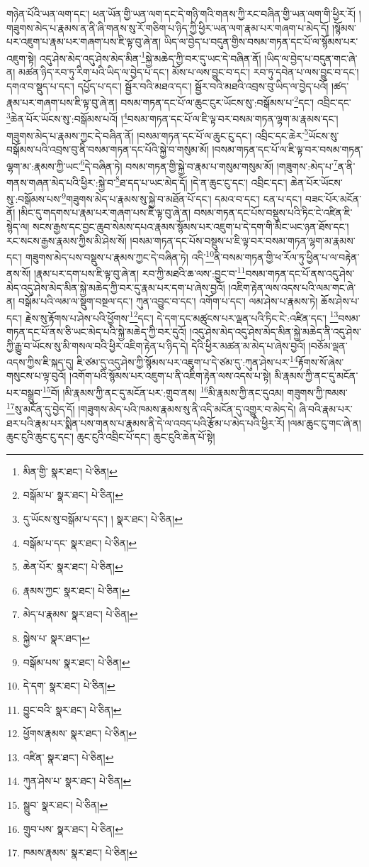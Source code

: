 གཉེན་པོའི་ཡན་ལག་དང་། ཕན་ཡོན་གྱི་ཡན་ལག་དང་དེ་གཉི་གའི་གནས་ཀྱི་རང་བཞིན་གྱི་ཡན་ལག་གི་ཕྱིར་རོ། །གཟུགས་མེད་པ་རྣམས་ན་ནི་ཞི་གནས་སུ་རོ་གཅིག་པ་ཉིད་ཀྱི་ཕྱིར་ཡན་ལག་རྣམ་པར་གཞག་པ་མེད་དོ། །སྙོམས་པར་འཇུག་པ་རྣམ་པར་གཞག་པས་ཇི་ལྟ་བུ་ཞེ་ན། ཡིད་ལ་བྱེད་པ་བདུན་གྱིས་བསམ་གཏན་དང་པོ་ལ་སྙོམས་པར་འཇུག་སྟེ། འདུ་ཤེས་མེད་འདུ་ཤེས་མེད་མིན་\footnote{མིན་གྱི་  སྣར་ཐང་།  པེ་ཅིན། }སྐྱེ་མཆེད་ཀྱི་བར་དུ་ཡང་དེ་བཞིན་ནོ། །ཡིད་ལ་བྱེད་པ་བདུན་གང་ཞེ་ན། མཚན་ཉིད་རབ་ཏུ་རིག་པའི་ཡིད་ལ་བྱེད་པ་དང་། མོས་པ་ལས་བྱུང་བ་དང་། རབ་ཏུ་དབེན་པ་ལས་བྱུང་བ་དང་། དགའ་བ་སྡུད་པ་དང་། དཔྱོད་པ་དང་། སྦྱོར་བའི་མཐའ་དང་། སྦྱོར་བའི་མཐའི་འབྲས་བུ་ཡིད་ལ་བྱེད་པའོ། །ཚད་རྣམ་པར་གཞག་པས་ཇི་ལྟ་བུ་ཞེ་ན། བསམ་གཏན་དང་པོ་ལ་ཆུང་ངུར་ཡོངས་སུ་:བསྒོམས་པ་\footnote{བསྒོམ་པ་  སྣར་ཐང་།  པེ་ཅིན། }དང་། འབྲིང་དང་\footnote{དུ་ཡོངས་སུ་བསྒོམ་པ་དང་། །  སྣར་ཐང་།  པེ་ཅིན། }ཆེན་པོར་ཡོངས་སུ་:བསྒོམས་པའོ། །\footnote{བསྒོམ་པ་དང་  སྣར་ཐང་།  པེ་ཅིན། }བསམ་གཏན་དང་པོ་ལ་ཇི་ལྟ་བར་བསམ་གཏན་ལྷག་མ་རྣམས་དང་། གཟུགས་མེད་པ་རྣམས་ཀྱང་དེ་བཞིན་ནོ། །བསམ་གཏན་དང་པོ་ལ་ཆུང་ངུ་དང་། འབྲིང་དང་ཆེར་\footnote{ཆེན་པོར་  སྣར་ཐང་།  པེ་ཅིན། }ཡོངས་སུ་བསྒོམས་པའི་འབྲས་བུ་ནི་བསམ་གཏན་དང་པོའི་སྐྱེ་བ་གསུམ་མོ། །བསམ་གཏན་དང་པོ་ལ་ཇི་ལྟ་བར་བསམ་གཏན་ལྷག་མ་:རྣམས་ཀྱི་ཡང་\footnote{རྣམས་ཀྱང་  སྣར་ཐང་།  པེ་ཅིན། }དེ་བཞིན་ཏེ། བསམ་གཏན་གྱི་སྐྱེ་བ་རྣམ་པ་གསུམ་གསུམ་མོ། །གཟུགས་:མེད་པ་\footnote{མེད་པ་རྣམས་  སྣར་ཐང་།  པེ་ཅིན། }ན་ནི་གནས་གཞན་མེད་པའི་ཕྱིར་:སྐྱེ་བ་\footnote{སྐྱེས་པ་  སྣར་ཐང་། }ཐ་དད་པ་ཡང་མེད་དོ། །དེ་ན་ཆུང་ངུ་དང་། འབྲིང་དང་། ཆེན་པོར་ཡོངས་སུ་:བསྒོམས་པས་\footnote{བསྒོམ་པས་  སྣར་ཐང་།  པེ་ཅིན། }གཟུགས་མེད་པ་རྣམས་སུ་སྐྱེ་བ་མཐོན་པོ་དང་། དམའ་བ་དང་། ངན་པ་དང་། བཟང་པོར་མངོན་ནོ། །མིང་དུ་གདགས་པ་རྣམ་པར་གཞག་པས་ཇི་ལྟ་བུ་ཞེ་ན། བསམ་གཏན་དང་པོས་བསྡུས་པའི་ཏིང་ངེ་འཛིན་ཇི་སྙེད་ལ། སངས་རྒྱས་དང་བྱང་ཆུབ་སེམས་དཔའ་རྣམས་སྙོམས་པར་འཇུག་པ་དེ་དག་གི་མིང་ཡང་ཉན་ཐོས་དང་། རང་སངས་རྒྱས་རྣམས་ཀྱིས་མི་ཤེས་སོ། །བསམ་གཏན་དང་པོས་བསྡུས་པ་ཇི་ལྟ་བར་བསམ་གཏན་ལྷག་མ་རྣམས་དང་། གཟུགས་མེད་པས་བསྡུས་པ་རྣམས་ཀྱང་དེ་བཞིན་ཏེ། འདི་\footnote{དེ་དག་  སྣར་ཐང་།  པེ་ཅིན། }ནི་བསམ་གཏན་གྱི་ཕ་རོལ་ཏུ་ཕྱིན་པ་ལ་བརྟེན་ནས་སོ། །རྣམ་པར་དག་པས་ཇི་ལྟ་བུ་ཞེ་ན། རབ་ཀྱི་མཐའི་ཆ་ལས་:བྱུང་བ་\footnote{བྱུང་བའི་  སྣར་ཐང་།  པེ་ཅིན། }བསམ་གཏན་དང་པོ་ནས་འདུ་ཤེས་མེད་འདུ་ཤེས་མེད་མིན་སྐྱེ་མཆེད་ཀྱི་བར་དུ་རྣམ་པར་དག་པ་ཞེས་བྱའོ། །འཇིག་རྟེན་ལས་འདས་པའི་ལམ་གང་ཞེ་ན། བསྒོམ་པའི་ལམ་ལ་སྡུག་བསྔལ་དང་། ཀུན་འབྱུང་བ་དང་། འགོག་པ་དང་། ལམ་ཤེས་པ་རྣམས་ཏེ། ཆོས་ཤེས་པ་དང་། རྗེས་སུ་རྟོགས་པ་ཤེས་པའི་ཕྱོགས་\footnote{ཕྱོགས་རྣམས་  སྣར་ཐང་།  པེ་ཅིན། }དང་། དེ་དག་དང་མཚུངས་པར་ལྡན་པའི་ཏིང་ངེ་:འཛིན་དང་། \footnote{འཛིན་  སྣར་ཐང་།  པེ་ཅིན། }བསམ་གཏན་དང་པོ་ནས་ཅི་ཡང་མེད་པའི་སྐྱེ་མཆེད་ཀྱི་བར་དུའོ། །འདུ་ཤེས་མེད་འདུ་ཤེས་མེད་མིན་སྐྱེ་མཆེད་ནི་འདུ་ཤེས་ཀྱི་རྒྱུ་བ་ཡོངས་སུ་མི་གསལ་བའི་ཕྱིར་འཇིག་རྟེན་པ་ཉིད་དེ། དེའི་ཕྱིར་མཚན་མ་མེད་པ་ཞེས་བྱའོ། །བཅོམ་ལྡན་འདས་ཀྱིས་ཇི་སྐད་དུ། ཇི་ཙམ་དུ་འདུ་ཤེས་ཀྱི་སྙོམས་པར་འཇུག་པ་དེ་ཙམ་དུ་:ཀུན་ཤེས་པར་\footnote{ཀུན་ཤེས་པ་  སྣར་ཐང་།  པེ་ཅིན། }རྟོགས་སོ་ཞེས་གསུངས་པ་ལྟ་བུའོ། །འགོག་པའི་སྙོམས་པར་འཇུག་པ་ནི་འཇིག་རྟེན་ལས་འདས་པ་སྟེ། མི་རྣམས་ཀྱི་ནང་དུ་མངོན་པར་བསྒྲུབ་\footnote{སྒྲུབ་  སྣར་ཐང་།  པེ་ཅིན། }བོ། །མི་རྣམས་ཀྱི་ནང་དུ་མངོན་པར་:གྲུབ་ནས། \footnote{གྲུབ་པས་  སྣར་ཐང་།  པེ་ཅིན། }མི་རྣམས་ཀྱི་ནང་དུའམ། གཟུགས་ཀྱི་ཁམས་\footnote{ཁམས་རྣམས་  སྣར་ཐང་།  པེ་ཅིན། }སུ་མངོན་དུ་བྱེད་དོ། །གཟུགས་མེད་པའི་ཁམས་རྣམས་སུ་ནི་འདི་མངོན་དུ་འགྱུར་བ་མེད་དེ། ཞི་བའི་རྣམ་པར་ཐར་པའི་རྣམ་པར་སྨིན་པས་གནས་པ་རྣམས་ནི་དེ་ལ་འབད་པའི་རྩོམ་པ་མེད་པའི་ཕྱིར་རོ། །ལམ་ཆུང་ངུ་གང་ཞེ་ན། ཆུང་ངུའི་ཆུང་ངུ་དང་། ཆུང་ངུའི་འབྲིང་པོ་དང་། ཆུང་ངུའི་ཆེན་པོ་སྟེ། 